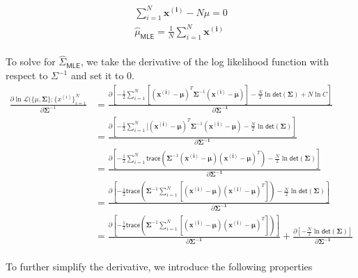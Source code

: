 \documentclass[11pt]{article}
\begin{document}
{\begin{gather*}
\sum\limits_{i=1}^N \mathbf{x^{(i)}} - N \mu=0\\
\hat{\mu}_{\mathsf{MLE}} = \frac{1}{N} \sum
\limits_{i=1}^N \mathbf{x^{(i)}}
\end{gather*}
\ \\
To solve for $\hat{\Sigma}_{\mathsf{MLE}}$, we take the derivative of the log likelihood function with respect to $\Sigma^{-1}$ and set it to 0.
\begin{equation}
    \begin{split}
        \frac{\partial { \ln \mathcal{L}( \{ \mu, \mathbf{\Sigma} \}; \{ x^{(i)}\}_{i = 1}^N}}{\partial \mathbf{\Sigma}^{-1}} &= \frac{\partial \left [-\frac{1}{2}\sum\limits_{i=1}^N [( \mathbf{x^{(i)}} - \mathbf{\mu})^T
	 	\mathbf{\Sigma}^{-1} ( \mathbf{x^{(i)}} - \mathbf{\mu})]-\frac{N}{2}\ln\mathsf{det}(\mathbf{\Sigma}) + N\ln C \right ]}{\partial \mathbf{\Sigma^{-1}}}\\
	 	&= \frac{\partial  \left [-\frac{1}{2}\sum\limits_{i=1}^N [( \mathbf{x^{(i)}} - \mathbf{\mu})^T
	 	\mathbf{\Sigma}^{-1} ( \mathbf{x^{(i)}} - \mathbf{\mu}) -\frac{N}{2}\ln\mathsf{det}(\mathbf{\Sigma})\right ]}{\partial \mathbf{\Sigma^{-1}}}\\
	 	&= \frac{\partial  \left[-\frac{1}{2}\sum\limits_{i=1}^N \mathsf{trace} \left ( \mathbf{\Sigma}^{-1}( \mathbf{x^{(i)}} - \mathbf{\mu})( \mathbf{x^{(i)}} - \mathbf{\mu})^T \right )
	 	  -\frac{N}{2}\ln\mathsf{det}(\mathbf{\Sigma})\right]}{\partial \mathbf{\Sigma^{-1}}}\\
	 	&=\frac{\partial  \left[-\frac{1}{2} \mathsf{trace} \left (\mathbf{\Sigma}^{-1}\sum\limits_{i=1}^N [( \mathbf{x^{(i)}} - \mathbf{\mu})( \mathbf{x^{(i)}} - \mathbf{\mu})^T] \right )
	 	  -\frac{N}{2}\ln\mathsf{det}(\mathbf{\Sigma})\right]}{\partial \mathbf{\Sigma^{-1}}}\\
	 	  &=\frac{\partial  \left[-\frac{1}{2} \mathsf{trace} \left (\mathbf{\Sigma}^{-1}\sum\limits_{i=1}^N [( \mathbf{x^{(i)}} - \mathbf{\mu})( \mathbf{x^{(i)}} - \mathbf{\mu})^T] \right )
	 	  \right]}{\partial \mathbf{\Sigma^{-1}}} +\frac{\partial \left[-\frac{N}{2}\ln\mathsf{det}(\mathbf{\Sigma})\right]}{\partial \mathbf{
	 	  \Sigma^{-1}}}
    \end{split}
\end{equation}
\ \\
To further simplify the derivative, we introduce the following properties
\ \\
\begin{itemize}
   


\end{itemize}}
\end{document}
